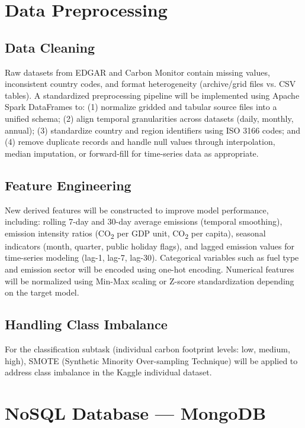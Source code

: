 \documentclass[conference]{IEEEtran}
\begin{document}
\section{Data Preprocessing}

\subsection{Data Cleaning}
Raw datasets from EDGAR and Carbon Monitor contain missing values, inconsistent country codes, and format heterogeneity (archive/grid files vs. CSV tables). A standardized preprocessing pipeline will be implemented using Apache Spark DataFrames to: (1) normalize gridded and tabular source files into a unified schema; (2) align temporal granularities across datasets (daily, monthly, annual); (3) standardize country and region identifiers using ISO 3166 codes; and (4) remove duplicate records and handle null values through interpolation, median imputation, or forward-fill for time-series data as appropriate.

\subsection{Feature Engineering}
New derived features will be constructed to improve model performance, including: rolling 7-day and 30-day average emissions (temporal smoothing), emission intensity ratios (CO\textsubscript{2} per GDP unit, CO\textsubscript{2} per capita), seasonal indicators (month, quarter, public holiday flags), and lagged emission values for time-series modeling (lag-1, lag-7, lag-30). Categorical variables such as fuel type and emission sector will be encoded using one-hot encoding. Numerical features will be normalized using Min-Max scaling or Z-score standardization depending on the target model.

\subsection{Handling Class Imbalance}
For the classification subtask (individual carbon footprint levels: low, medium, high), SMOTE (Synthetic Minority Over-sampling Technique) will be applied to address class imbalance in the Kaggle individual dataset.

\section{NoSQL Database — MongoDB}
\end{document}
